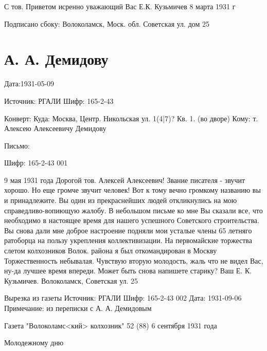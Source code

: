 \documentclass[]{memoir}
\begin{document}
 С тов. Приветом исренно уважающий Вас
Е.К. Кузьмичев
8 марта 1931 г

Подписано сбоку:
Волоколамск, Моск. обл. Советская ул. дом 25


\section{А. А. Демидову}

Дата:1931-05-09

Источник: РГАЛИ
Шифр: 165-2-43

Конверт:
Куда: Москва, Центр.
Никольская ул. 1(4|7)?
Кв. 1. (во дворе)
Кому: т. Алексею Алексеевичу Демидову



Письмо:

Шифр: 165-2-43 001

9 мая 1931 года
Дорогой тов. Алексей Алексеевич!
Звание писателя - звучит хорошо.
Но еще громче звучит человек! Вот к тому вечно громкому названию вы и принадлежите. Вы один из прекраснейших людей откликнулись на мою справедливо-вопиющую жалобу. В небольшом письме ко мне Вы сказали все, что необходимо в настоящее время для нашего успешного Советского строительства. Вы снова дали мне доброе настроение подняли мои усталые члены 65 летняго ратоборца на пользу укрепления коллективизации. На первомайские торжества слетом колхозников Волок. района я был откомандирован в Москву Торжественность небывалая. Чувствую вторую молодость, жаль что не видел Вас, ну-да лучшее время впереди. Может быть снова напишете старику?
Ваш Е. К. Кузьмичев. Волоколамск, Советская ул. 25



Вырезка из газеты
Источник: РГАЛИ
Шифр: 165-2-43 002
Дата: 1931-09-06
Примечание: из переписки с А. А. Демидовым

Газета "Волоколамс<кий> колхозник" 52 (88) 6 сентября 1931 года

Молодежному дню
\end{document}
